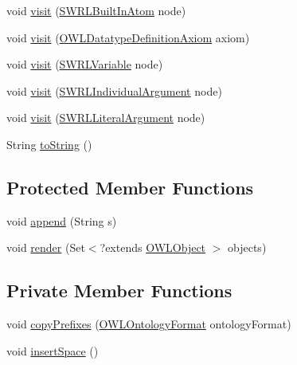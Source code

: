 \begin{DoxyCompactItemize}
void \hyperlink{classorg_1_1semanticweb_1_1owlapi_1_1util_1_1_simple_renderer_af2e5689c2e1d8d9f2bc6da7a5bbe0dd4}{visit} (\hyperlink{interfaceorg_1_1semanticweb_1_1owlapi_1_1model_1_1_s_w_r_l_built_in_atom}{S\-W\-R\-L\-Built\-In\-Atom} node)
\item 
void \hyperlink{classorg_1_1semanticweb_1_1owlapi_1_1util_1_1_simple_renderer_acfe6b027edd1302ab2a272cecc5c4220}{visit} (\hyperlink{interfaceorg_1_1semanticweb_1_1owlapi_1_1model_1_1_o_w_l_datatype_definition_axiom}{O\-W\-L\-Datatype\-Definition\-Axiom} axiom)
\item 
void \hyperlink{classorg_1_1semanticweb_1_1owlapi_1_1util_1_1_simple_renderer_a5869d10150bbe93c97fa9853c89541a9}{visit} (\hyperlink{interfaceorg_1_1semanticweb_1_1owlapi_1_1model_1_1_s_w_r_l_variable}{S\-W\-R\-L\-Variable} node)
\item 
void \hyperlink{classorg_1_1semanticweb_1_1owlapi_1_1util_1_1_simple_renderer_a175c77583926bfc4273da05e0e39f5b5}{visit} (\hyperlink{interfaceorg_1_1semanticweb_1_1owlapi_1_1model_1_1_s_w_r_l_individual_argument}{S\-W\-R\-L\-Individual\-Argument} node)
\item 
void \hyperlink{classorg_1_1semanticweb_1_1owlapi_1_1util_1_1_simple_renderer_a857fad8c398c87262e5fe1d15e4cd3cf}{visit} (\hyperlink{interfaceorg_1_1semanticweb_1_1owlapi_1_1model_1_1_s_w_r_l_literal_argument}{S\-W\-R\-L\-Literal\-Argument} node)
\item 
String \hyperlink{classorg_1_1semanticweb_1_1owlapi_1_1util_1_1_simple_renderer_afbb7da30db88494d4f97ac0f7e76e87f}{to\-String} ()
\end{DoxyCompactItemize}
\subsection*{Protected Member Functions}
\begin{DoxyCompactItemize}
\item 
void \hyperlink{classorg_1_1semanticweb_1_1owlapi_1_1util_1_1_simple_renderer_aeb521ed29a62fbc1822bc47be1d258f9}{append} (String s)
\item 
void \hyperlink{classorg_1_1semanticweb_1_1owlapi_1_1util_1_1_simple_renderer_a2fa486933e5f38628bb8a0f9ff2375f1}{render} (Set$<$?extends \hyperlink{interfaceorg_1_1semanticweb_1_1owlapi_1_1model_1_1_o_w_l_object}{O\-W\-L\-Object} $>$ objects)
\end{DoxyCompactItemize}
\subsection*{Private Member Functions}
\begin{DoxyCompactItemize}
\item 
void \hyperlink{classorg_1_1semanticweb_1_1owlapi_1_1util_1_1_simple_renderer_afcb937a59d9c4ad12ad5b1fa31a50bcb}{copy\-Prefixes} (\hyperlink{classorg_1_1semanticweb_1_1owlapi_1_1model_1_1_o_w_l_ontology_format}{O\-W\-L\-Ontology\-Format} ontology\-Format)
\item 
void \hyperlink{classorg_1_1semanticweb_1_1owlapi_1_1util_1_1_simple_renderer_a4f3167ef636879ffa919e9f5157117bb}{insert\-Space} ()
\end{DoxyCompactItemize}

